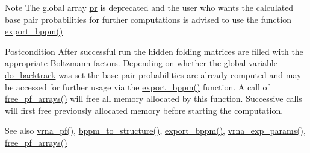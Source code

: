 \begin{DoxyNote}{Note}
The global array \hyperlink{fold__vars_8h_ac98ec419070aee6831b44e5c700f090f}{pr} is deprecated and the user who wants the calculated base pair probabilities for further computations is advised to use the function \hyperlink{group__part__func__global__deprecated_gac5ac7ee281aae1c5cc5898a841178073}{export\+\_\+bppm()} 
\end{DoxyNote}
\begin{DoxyPostcond}{Postcondition}
After successful run the hidden folding matrices are filled with the appropriate Boltzmann factors. Depending on whether the global variable \hyperlink{group__model__details_gad512b5dd4dbec60faccfe137bb474489}{do\+\_\+backtrack} was set the base pair probabilities are already computed and may be accessed for further usage via the \hyperlink{group__part__func__global__deprecated_gac5ac7ee281aae1c5cc5898a841178073}{export\+\_\+bppm()} function. A call of \hyperlink{group__part__func__global__deprecated_gae73db3f49a94f0f72e067ecd12681dbd}{free\+\_\+pf\+\_\+arrays()} will free all memory allocated by this function. Successive calls will first free previously allocated memory before starting the computation. 
\end{DoxyPostcond}
\begin{DoxySeeAlso}{See also}
\hyperlink{group__part__func__global_ga29e256d688ad221b78d37f427e0e99bc}{vrna\+\_\+pf()}, \hyperlink{group__struct__utils__deprecated_ga129d81c4a1ead793c5b2311333e03dfa}{bppm\+\_\+to\+\_\+structure()}, \hyperlink{group__part__func__global__deprecated_gac5ac7ee281aae1c5cc5898a841178073}{export\+\_\+bppm()}, \hyperlink{group__energy__parameters_gab1f3016f96aa96bff020cdd904605afa}{vrna\+\_\+exp\+\_\+params()}, \hyperlink{group__part__func__global__deprecated_gae73db3f49a94f0f72e067ecd12681dbd}{free\+\_\+pf\+\_\+arrays()} 
\end{DoxySeeAlso}

